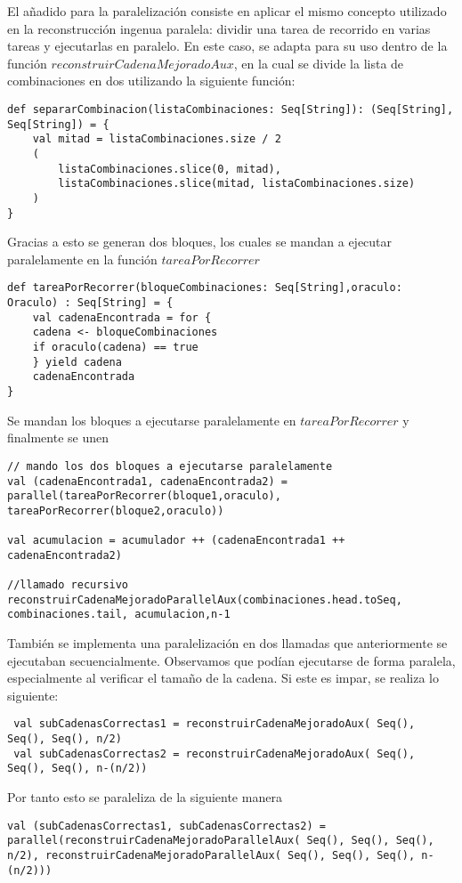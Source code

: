 \documentclass[conference]{IEEEtran}
\begin{document}
El añadido para la paralelización consiste en aplicar el mismo concepto utilizado en la reconstrucción ingenua paralela: dividir una tarea de recorrido en varias tareas y ejecutarlas en paralelo. En este caso, se adapta para su uso dentro de la función $reconstruirCadenaMejoradoAux$, en la cual se divide la lista de combinaciones en dos utilizando la siguiente función:
\begin{lstlisting}
def separarCombinacion(listaCombinaciones: Seq[String]): (Seq[String],  Seq[String]) = {
    val mitad = listaCombinaciones.size / 2
    (
        listaCombinaciones.slice(0, mitad),
        listaCombinaciones.slice(mitad, listaCombinaciones.size)
    )
}
\end{lstlisting}
Gracias a esto se generan dos bloques, los cuales se mandan a ejecutar paralelamente en la función $tareaPorRecorrer$
\begin{lstlisting}
def tareaPorRecorrer(bloqueCombinaciones: Seq[String],oraculo: Oraculo) : Seq[String] = {
    val cadenaEncontrada = for {
    cadena <- bloqueCombinaciones
    if oraculo(cadena) == true
    } yield cadena
    cadenaEncontrada
}
\end{lstlisting}

Se mandan los bloques a ejecutarse paralelamente en $tareaPorRecorrer$ y finalmente se unen 
\begin{lstlisting}
// mando los dos bloques a ejecutarse paralelamente
val (cadenaEncontrada1, cadenaEncontrada2) = parallel(tareaPorRecorrer(bloque1,oraculo), tareaPorRecorrer(bloque2,oraculo))

val acumulacion = acumulador ++ (cadenaEncontrada1 ++ cadenaEncontrada2)

//llamado recursivo
reconstruirCadenaMejoradoParallelAux(combinaciones.head.toSeq, combinaciones.tail, acumulacion,n-1

\end{lstlisting}

También se implementa una paralelización en dos llamadas que anteriormente se ejecutaban secuencialmente. Observamos que podían ejecutarse de forma paralela, especialmente al verificar el tamaño de la cadena. Si este es impar, se realiza lo siguiente:
\begin{lstlisting}
 val subCadenasCorrectas1 = reconstruirCadenaMejoradoAux( Seq(), Seq(), Seq(), n/2) 
 val subCadenasCorrectas2 = reconstruirCadenaMejoradoAux( Seq(), Seq(), Seq(), n-(n/2))
\end{lstlisting}
Por tanto esto se paraleliza de la siguiente manera
\begin{lstlisting}
val (subCadenasCorrectas1, subCadenasCorrectas2) = parallel(reconstruirCadenaMejoradoParallelAux( Seq(), Seq(), Seq(), n/2), reconstruirCadenaMejoradoParallelAux( Seq(), Seq(), Seq(), n-(n/2)))
\end{lstlisting}
\end{document}
